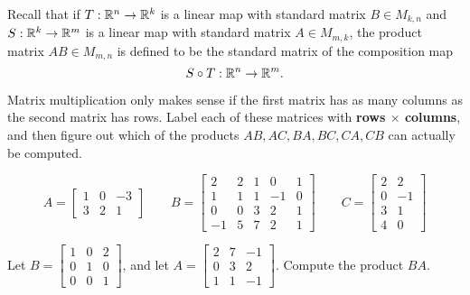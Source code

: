 \begin{applicationActivities}

\begin{observation}
Recall that if \(T: \mathbb{R}^n \rightarrow \mathbb{R}^k\) is a linear map with standard matrix \(B \in M_{k,n}\) and \(S: \mathbb{R}^k \rightarrow \mathbb{R}^m\) is a linear map with standard matrix \(A \in M_{m,k}\), the product matrix \(AB \in M_{m,n}\) is defined to be the standard matrix of the composition map \[S \circ T: \mathbb{R}^n \rightarrow \mathbb{R}^m.\]
\end{observation}


\begin{activity}{5}
Matrix multiplication only makes sense if the first matrix has as many
columns as the second matrix has rows. Label each of these matrices
with \textbf{rows \(\times\) columns}, and then figure out which of
the products \(AB,AC,BA,BC,CA,CB\) can actually be computed.

\[
  A = \begin{bmatrix}1&0&-3\\3&2&1\end{bmatrix}
    \hspace{2em}
  B = \begin{bmatrix}2&2&1&0&1\\1&1&1&-1&0\\0&0&3&2&1\\-1&5&7&2&1\end{bmatrix}
    \hspace{2em}
  C = \begin{bmatrix}2&2\\0&-1\\3&1\\4&0\end{bmatrix}
\]
\end{activity}




\begin{activity}{10}
Let \(B=\begin{bmatrix}1 & 0  & 2 \\ 0 & 1 & 0 \\ 0 & 0 & 1 \end{bmatrix}\), and let \(A=\begin{bmatrix} 2 & 7 & -1 \\ 0 & 3 & 2 \\ 1 & 1 & -1 \end{bmatrix}\).  Compute the product \(BA\).
\end{activity}


\end{applicationActivities}
